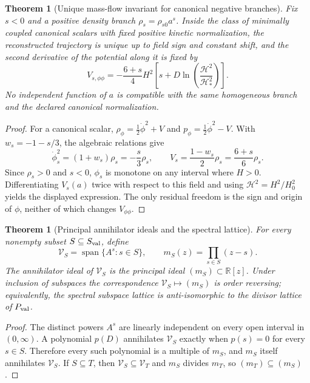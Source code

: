\documentclass[11pt,a4paper]{article}
\def\Dil{D}%
\numberwithin{equation}{section}
\theoremstyle{definition}
\theoremstyle{plain}
\newtheorem{theorem}[criterion]{Theorem}
\theoremstyle{remark}
\newcommand{\Dil}{\mathscr{D}}
\begin{document}
\begin{theorem}[Unique mass-flow invariant for canonical negative branches]
Fix \(s<0\) and a positive density branch \(\rho_s=\rho_{s0}a^s\).  Inside the
class of minimally coupled canonical scalars with fixed positive kinetic
normalization, the reconstructed trajectory is unique up to field sign and
constant shift, and the second derivative of the potential along it is fixed by
\begin{equation}
\boxed{
V_{s,\phi\phi}
=-\frac{6+s}{4}H^2
\left[
 s+\Dil\ln\left(\frac{\mathcal H^2}{\mathcal H_*^2}\right)
\right].
}
\end{equation}
No independent function of \(a\) is compatible with the same homogeneous branch
and the declared canonical normalization.
\end{theorem}
\begin{proof}
For a canonical scalar,
\(\rho_\phi=\frac12\dot\phi^2+V\) and
\(p_\phi=\frac12\dot\phi^2-V\).  With
\(w_s=-1-s/3\), the algebraic relations give
\begin{equation}
\dot\phi_s^2=(1+w_s)\rho_s=-\frac{s}{3}\rho_s,
\qquad
V_s=\frac{1-w_s}{2}\rho_s=\frac{6+s}{6}\rho_s.
\end{equation}
Since \(\rho_s>0\) and \(s<0\), \(\phi_s\) is monotone on any interval where
\(H>0\).  Differentiating \(V_s(a)\) twice with respect to this field and using
\(\mathcal H^2=H^2/H_0^2\) yields the displayed expression.  The only residual
freedom is the sign and origin of \(\phi\), neither of which changes
\(V_{\phi\phi}\).
\end{proof}

\begin{theorem}[Principal annihilator ideals and the spectral lattice]
For every nonempty subset \(S\subseteq S_{\rm val}\), define
\begin{equation}
\mathcal V_S=\operatorname{span}\{A^s:s\in S\},
\qquad
m_S(z)=\prod_{s\in S}(z-s).
\end{equation}
The annihilator ideal of \(\mathcal V_S\) is the principal ideal
\((m_S)\subset\mathbb R[z]\).  Under inclusion of subspaces the correspondence
\(\mathcal V_S\mapsto(m_S)\) is order reversing; equivalently, the spectral
subspace lattice is anti-isomorphic to the divisor lattice of \(P_{\rm val}\).
\end{theorem}
\begin{proof}
The distinct powers \(A^s\) are linearly independent on every open interval in
\((0,\infty)\).  A polynomial \(p(\Dil)\) annihilates \(\mathcal V_S\) exactly
when \(p(s)=0\) for every \(s\in S\).  Therefore every such polynomial is a
multiple of \(m_S\), and \(m_S\) itself annihilates \(\mathcal V_S\).  If
\(S\subseteq T\), then \(\mathcal V_S\subseteq\mathcal V_T\) and
\(m_S\) divides \(m_T\), so \((m_T)\subseteq(m_S)\).
\end{proof}
\end{document}
